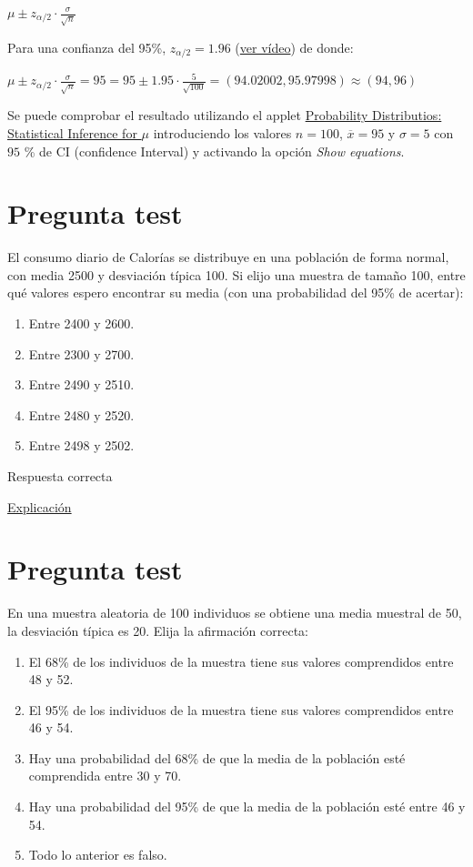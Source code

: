 \documentclass[
]{book}
\providecommand{\tightlist}{%
  \setlength{\itemsep}{0pt}\setlength{\parskip}{0pt}}
\begin{document}
\(\mu \pm z_{\alpha/2} \cdot \frac{\sigma}{\sqrt{n}}\)

Para una confianza del 95\%, \(z_{\alpha/2} = 1.96\) (\href{https://youtu.be/wWeogWp_bO8}{ver vídeo}) de donde:

\(\mu \pm z_{\alpha/2} \cdot \frac{\sigma}{\sqrt{n}}= 95 = 95 \pm 1.95 \cdot \frac{5}{\sqrt{100}}= (94.02002,95.97998) \approx (94, 96)\)

Se puede comprobar el resultado utilizando el applet \href{https://homepage.divms.uiowa.edu/~mbognar/applets/mu.raw.html}{Probability Distributios: Statistical Inference for \(\mu\)} introduciendo los valores \(n=100\), \(\overline{x}=95\) y \(\sigma = 5\) con \(95\) \% de CI (confidence Interval) y activando la opción \emph{Show equations}.

\hypertarget{pregunta-test-94}{%
\section{Pregunta test}\label{pregunta-test-94}}

El consumo diario de Calorías se distribuye en una población de forma normal, con media 2500 y desviación típica 100. Si elijo una muestra de tamaño 100, entre qué valores espero encontrar su media (con una probabilidad del 95\% de acertar):

\begin{enumerate}
\def\labelenumi{\alph{enumi})}
\tightlist
\item
  Entre 2400 y 2600.
\item
  Entre 2300 y 2700.
\item
  Entre 2490 y 2510.
\item
  Entre 2480 y 2520.
\item
  Entre 2498 y 2502.
\end{enumerate}

Respuesta correcta

\href{https://homepage.divms.uiowa.edu/~mbognar/}{Explicación}

\hypertarget{pregunta-test-95}{%
\section{Pregunta test}\label{pregunta-test-95}}

En una muestra aleatoria de 100 individuos se obtiene una media muestral de 50, la desviación típica es 20. Elija la afirmación correcta:

\begin{enumerate}
\def\labelenumi{\alph{enumi})}
\tightlist
\item
  El 68\% de los individuos de la muestra tiene sus valores comprendidos entre 48 y 52.
\item
  El 95\% de los individuos de la muestra tiene sus valores comprendidos entre 46 y 54.
\item
  Hay una probabilidad del 68\% de que la media de la población esté comprendida entre 30 y 70.
\item
  Hay una probabilidad del 95\% de que la media de la población esté entre 46 y 54.
\item
  Todo lo anterior es falso.
\end{enumerate}
\end{document}
